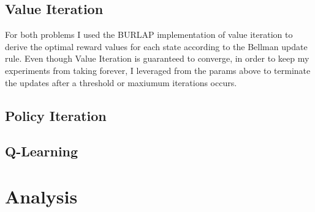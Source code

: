 \documentclass[11pt]{article}
\begin{document}
    \subsection{Value Iteration}
    For both problems I used the BURLAP implementation of value iteration to derive the optimal reward values for each state
    according to the Bellman update rule.
    Even though Value Iteration is guaranteed to converge, in order to keep my experiments from taking forever, I leveraged
    from the params above to terminate the updates after a threshold or maxiumum iterations occurs.
    \subsection{Policy Iteration}
    \subsection{Q-Learning}



    \section{Analysis}
\end{document}
